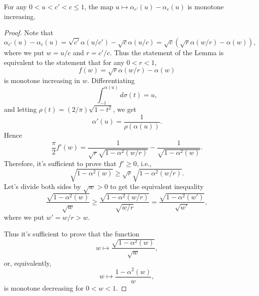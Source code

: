 \documentclass[10pt,a4paper]{amsart}
\begin{document}
\begin{lemma} \label{lem:dIsMonotone}
    For any $0<u<c'<c\leq 1$, the map $u\mapsto  \alpha_{c'}(u) - \alpha_c(u) $ is monotone increasing.
\end{lemma}

\begin{proof}
Note that $$\alpha_{c'}(u)-\alpha_c(u) = \sqrt{c'}\alpha(u/c') - \sqrt{c}\alpha(u/c) = \sqrt{c}\left(\sqrt{r}\alpha\left(w/r\right)  -\alpha(w)\right),$$ where we put $w=u/c$ and $r=c'/c$. Thus the statement of the Lemma is equivalent to the statement that for any $0<r<1$,  $$f(w) = 
\sqrt{r} \alpha(w/r) - \alpha(w)$$ is monotone increasing in $w$.
Differentiating $$\int_{-1}^{\alpha(u)} d\sigma(t) = u,$$ and letting $\rho(t)=(2/\pi)\sqrt{1-t^2}$, we get  $$
\alpha'(u) = \frac{1}{\rho(\alpha(u))}.$$ Hence
$$\frac{\pi}{2} f'(w) =\frac{1}{\sqrt{r}\sqrt{1-\alpha^2(w/r)}} - \frac{1}{\sqrt{1-\alpha^2(w)}}.$$ Therefore, it's sufficient to prove that $f'\geq 0$, i.e., $$
\sqrt{1-\alpha^2(w)} \geq \sqrt{r}\sqrt{1-\alpha^2(w/r)}.
$$
Let's divide both sides by $\sqrt{w}>0$ to get the equivalent inequality
$$
\frac{\sqrt{1-\alpha^2(w)}}{\sqrt{w}} \geq 
\frac{\sqrt{1-\alpha^2(w/r)}}{\sqrt{w/r}} = \frac{\sqrt{1-\alpha^2(w')}}{\sqrt{w'}},
$$ where we put $w'=w/r>w$.

Thus it's sufficient to prove that the function $$w\mapsto\frac{\sqrt{1-\alpha^2(w)}}{\sqrt{w}},$$ or, equivalently,
$$w\mapsto \frac{1-\alpha^2(w)}{w},$$ is monotone decreasing for $0<w<1$. 


\end{proof}
\end{document}
